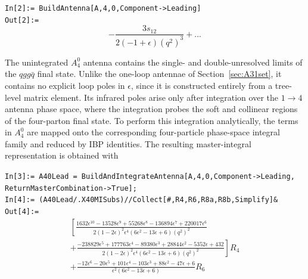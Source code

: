 \begin{mdframed}[backgroundcolor=gray!10, linewidth=0pt]
\texttt{In[2]:= BuildAntenna[A,4,0,Component->Leading]}\\
\hfill
\texttt{Out[2]:=}
    \begin{equation*}
        -\frac{3s_{12}}{2(-1+\epsilon)\!\left(q^2\right)^3}+...
    \end{equation*}
\end{mdframed}

The unintegrated $A_4^0$ antenna contains the single- and double-unresolved limits of the
$qgg\bar q$ final state. Unlike the one-loop antennae of Section~\ref{sec:A31set}, it contains
no explicit loop poles in $\epsilon$, since it is constructed entirely from a tree-level matrix
element. Its infrared poles arise only after integration over the $1\to4$ antenna phase space,
where the integration probes the soft and collinear regions of the four-parton final state. To
perform this integration analytically, the terms in $A_4^0$ are mapped onto the corresponding
four-particle phase-space integral family and reduced by IBP identities. The resulting
master-integral representation is obtained with

\begin{mdframed}[backgroundcolor=gray!10, linewidth=0pt]
\texttt{In[3]:= A40Lead = BuildAndIntegrateAntenna[A,4,0,Component->Leading,\\ReturnMasterCombination->True];}\\
\texttt{In[4]:= (A40Lead/.X40MISubs)//Collect[\#,{R4,R6,R8a,R8b},Simplify]\&}\\
\hfill
\texttt{Out[4]:=}
    \begin{equation*}
        \begin{gathered}
            \left[\frac{1632\epsilon^{10}-13528\epsilon^9+55268\epsilon^8-136894\epsilon^7+220017\epsilon^6}{2(1-2\epsilon)^2\epsilon^4\left(6\epsilon^2-13\epsilon+6\right)\left(q^2\right)^2}\right.\\
            \left.+\frac{-238829\epsilon^5+177763\epsilon^4-89380\epsilon^3+28844\epsilon^2-5352\epsilon+432}{2(1-2\epsilon)^2\epsilon^4\left(6\epsilon^2-13\epsilon+6\right)\left(q^2\right)^2}\right]R_4\\
            +\frac{-12\epsilon^6-20\epsilon^5+101\epsilon^4-103\epsilon^3+88\epsilon^2-47\epsilon+6}{\epsilon^2\left(6\epsilon^2-13\epsilon+6\right)}R_6
        \end{gathered}
    \end{equation*}
\end{mdframed}

